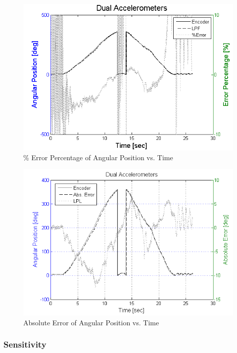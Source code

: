 \documentclass{article}
\theoremstyle{plain}
\theoremstyle{definition}
\theoremstyle{remark}
\begin{document}
\begin{figure}[hbt]
\begin{center}
\includegraphics[width = 13cm]{Dual_ErrorPercentage.png}
\caption{\% Error Percentage of Angular Position vs. Time}
\label{Dual_ErrorPercentage}
\end{center}
\end{figure}

\begin{figure}[hbt]
\begin{center}
\includegraphics[width = 13cm]{Dual_AbsError.png}
\caption{Absolute Error of Angular Position vs. Time}
\label{Dual_AbsError}
\end{center}
\end{figure}

\clearpage
\subsubsection{Sensitivity}
\end{document}
